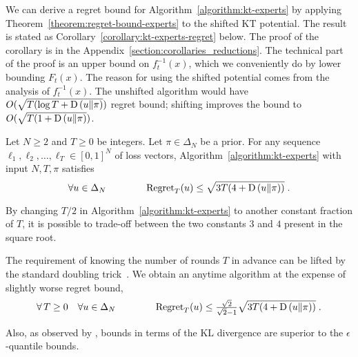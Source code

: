 We can derive a regret bound for Algorithm~\ref{algorithm:kt-experts} by
applying Theorem~\ref{theorem:regret-bound-experts} to the shifted KT potential.
The result is stated as Corollary~\ref{corollary:kt-experts-regret} below. The
proof of the corollary is in the Appendix~\ref{section:corollaries_reductions}.
The technical part of the proof is an upper bound on $f_t^{-1}(x)$, which we
conveniently do by lower bounding $F_t(x)$. The reason for using the shifted
potential comes from the analysis of $f_t^{-1}(x)$. The unshifted algorithm would
have $O(\sqrt{T (\log T + \operatorname*{D}\left({u}\middle\|{\pi}\right)})$ regret bound; shifting improves the
bound to $O(\sqrt{T (1 + \operatorname*{D}\left({u}\middle\|{\pi}\right)})$.

\begin{corollary}
\label{corollary:kt-experts-regret}
Let $N \ge 2$ and $T \ge 0$ be integers. Let $\pi \in \Delta_N$ be a prior.
For any sequence $\ell_1, \ell_2, \dots, \ell_T \in
[0,1]^N$ of loss vectors, Algorithm~\ref{algorithm:kt-experts}
with input $N,T,\pi$ satisfies
\[
\forall u \in \Delta_N \qquad \qquad \operatorname{Regret}_T(u) \le \sqrt{3T (4 + \operatorname*{D}\left({u}\middle\|{\pi}\right))} \; .
\]
\end{corollary}
By changing $T/2$ in Algorithm~\ref{algorithm:kt-experts} to another constant
fraction of $T$, it is possible to trade-off between the two constants $3$ and
$4$ present in the square root.

The requirement of knowing the number of rounds $T$ in advance can be lifted by
the standard doubling trick~\citep[Section 2.3.1]{Shalev-Shwartz12}. We obtain
an anytime algorithm at the expense of slightly worse regret bound,
\[
\forall \, T \ge 0 \quad \forall u \in \Delta_N \qquad \qquad
\operatorname{Regret}_T(u) \le \tfrac{\sqrt{2}}{\sqrt{2} - 1} \sqrt{3T (4 + \operatorname*{D}\left({u}\middle\|{\pi}\right))} \; .
\]

Also, as observed by \citet{ChernovV10}, bounds in terms of the KL
divergence are superior to the $\epsilon$-quantile bounds.
